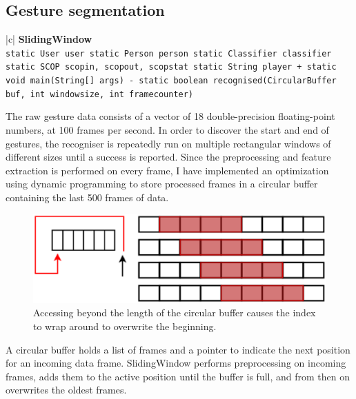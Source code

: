 \documentclass[12pt,a4,notitlepage]{report}
\renewcommand{\_}{\texttt{\symbol{95}}}
\newcommand{\<}{\texttt{\symbol{60}}}
\renewcommand{\>}{\texttt{\symbol{62}}}
\newcommand{\class}[1]{\textbf{#1}}
\newcommand{\variable}[1]{\texttt{#1}}
\begin{document}
\subsection{Gesture segmentation}

\begin{tabular}{|c|} \hline 
\class{SlidingWindow} \\ \hline
{}
{ \variable{static User user \newline
static Person person \newline
static Classifier classifier \newline
static SCOP scopin, scopout, scopstat \newline
static String player \newline
+ static void main(String[] args) \newline
- static boolean recognised(CircularBuffer buf, int windowsize,	int framecounter)
} } \\ \hline
\end{tabular}

The raw gesture data consists of a vector of 18 double-precision floating-point numbers, at 100 frames per second. In order to discover the start and end of gestures, the recogniser is repeatedly run on multiple rectangular windows of different sizes until a success is reported. Since the preprocessing and feature extraction is performed on every frame, I have implemented an optimization using dynamic programming to store processed frames in a circular buffer containing the last 500 frames of data.

\begin{figure}
\centering
\includegraphics[scale=0.5,angle=0]{diagrams/slidingwindow.ps}
\caption{Accessing beyond the length of the circular buffer causes the index to wrap around to overwrite the beginning.}
\label{circbuf}
\end{figure}

A circular buffer holds a list of frames and a pointer to indicate the next position for an incoming data frame. SlidingWindow performs preprocessing on  incoming frames, adds them to the active position until the buffer is full, and from then on overwrites the oldest frames.
\end{document}
